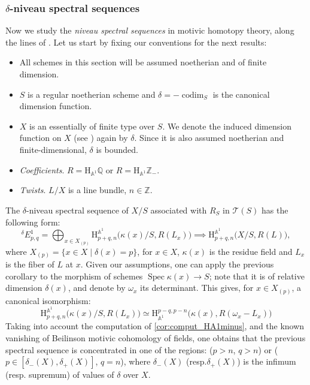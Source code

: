 \documentclass[11pt]{article}
\newcommand{\resp}{resp.\xspace}
\numberwithin{equation}{section}\renewcommand{\encodingdefault}{TU}
\newcommand{\T}{\mathscr T}
\renewcommand{\AA}{\mathbb A}
\newcommand{\HA}{\mathrm H_{\AA^1}}
\newcommand{\BA}{\mathrm H^{\AA^1}}
\DeclareMathOperator{\codim}{codim}
\DeclareMathOperator{\spec}{Spec}
\newcommand{\ZZ} {\mathbb Z}
\newcommand{\QQ} {\mathbb Q}
\theoremstyle{remark}
\theoremstyle{definition}
\newcommand{\numer}[1]{\refstepcounter{thm}\subsubsection{#1}}
\numberwithin{equation}{thm}
\begin{document}
\numer{$\delta$-niveau spectral sequences}\label{num:coniveau}
Now we study the \emph{niveau spectral sequences} in motivic homotopy theory, along the lines of \cite[\S 3.1]{BD1}.
Let us start by fixing our conventions for the next results:
\begin{itemize}
\item All schemes in this section will be assumed noetherian and of finite dimension.
\item $S$ is a regular noetherian scheme and $\delta=-\codim_S$ is the canonical dimension function.
\item $X$ is an essentially of finite type over $S$.
We denote the induced dimension function on $X$ (see \cite[1.1.7]{BD1}) again by $\delta$.
Since it is also assumed noetherian and finite-dimensional, $\delta$ is bounded.
\item \emph{Coefficients}. $R=\HA \QQ$ or $R=\HA \ZZ_-$.
\item \emph{Twists}.
$L/X$ is a line bundle, $n \in \ZZ$.
\end{itemize}

The $\delta$-niveau spectral sequence of $X/S$ associated with $R_S$ in $\T(S)$
has the following form:
\begin{equation*}\label{eq:nivss}
{}^\delta E^1_{p,q}=\bigoplus_{x \in X_{(p)}} \BA_{p+q,n}\big(\kappa(x)/S,R(L_x)\big) \implies \BA_{p+q,n}\big(X/S,R(L)\big),
\end{equation*}
where $X_{(p)}=\{x \in X \mid \delta(x)=p\}$, for $x \in X$, $\kappa(x)$ is the residue field and $L_x$ is the fiber of $L$ at $x$.
Given our assumptions, one can apply the previous corollary to
the morphism of schemes $\spec{\kappa(x)} \to S$; note that it is of relative dimension $\delta(x)$,
and denote by $\omega_x$ its determinant. This gives, for $x \in X_{(p)}$, a canonical isomorphism:
\begin{equation*}
\BA_{p+q,n}\big(\kappa(x)/S,R(L_x)\big) \simeq \HA^{p-q,p-n}\big(\kappa(x),R(\omega_x-L_x)\big)
\end{equation*}
Taking into account the computation of \eqref{cor:comput_HA1minus}, and the known vanishing of Beilinson motivic cohomology
of fields, one obtains that the previous spectral sequence is concentrated in one of the regions: ($p>n$, $q>n$)
or ($p \in [\delta_-(X),\delta_+(X)]$, $q=n$), where $\delta_-(X)$ (\resp $\delta_+(X)$) is the infimum (\resp supremum) of values of $\delta$ over $X$.
\end{document}
